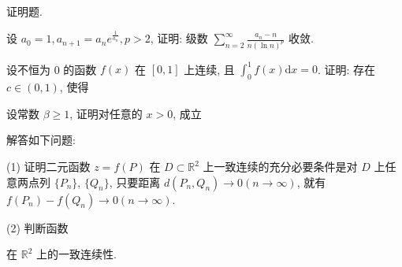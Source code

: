 证明题.\par
设 $a_0 = 1, a_{n+1} = a_n e^{\frac{1}{a_n}}, p > 2$, 证明: 级数 $\sum_{n=2}^{\infty} \frac{a_n - n}{n (\ln n)^p}$ 收敛.\par
\par{}
设不恒为 0 的函数 $f(x)$ 在 $[0,1]$ 上连续, 且 $\int_0^1 f(x)\mathrm{d}x = 0$. 证明: 存在 $c\in (0,1)$, 使得\par
\nopagebreak[4]
\par{}
设常数 $\beta \geq 1$, 证明对任意的 $x > 0$, 成立\par
\nopagebreak[4]
解答如下问题:\par
(1) 证明二元函数 $z = f(P)$ 在 $D \subset \mathbb{R}^2$ 上一致连续的充分必要条件是对 $D$ 上任意两点列 $\{P_n\}$, $\{Q_n\}$, 只要距离 $d(P_n, Q_n) \to 0 (n \to \infty)$, 就有 $f(P_n) - f(Q_n) \to 0 (n \to \infty)$.\par
\par{}
(2) 判断函数\par
\nopagebreak[4]
在 $\mathbb{R}^2$ 上的一致连续性.\par
